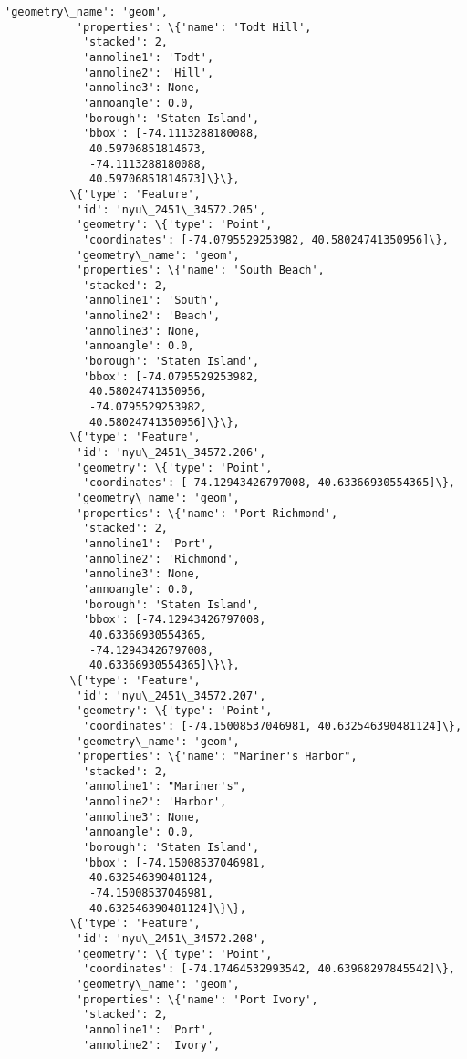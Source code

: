 \documentclass[11pt]{article}
\begin{document}
\begin{Verbatim}[commandchars=\\\{\}]
           'geometry\_name': 'geom',
           'properties': \{'name': 'Todt Hill',
            'stacked': 2,
            'annoline1': 'Todt',
            'annoline2': 'Hill',
            'annoline3': None,
            'annoangle': 0.0,
            'borough': 'Staten Island',
            'bbox': [-74.1113288180088,
             40.59706851814673,
             -74.1113288180088,
             40.59706851814673]\}\},
          \{'type': 'Feature',
           'id': 'nyu\_2451\_34572.205',
           'geometry': \{'type': 'Point',
            'coordinates': [-74.0795529253982, 40.58024741350956]\},
           'geometry\_name': 'geom',
           'properties': \{'name': 'South Beach',
            'stacked': 2,
            'annoline1': 'South',
            'annoline2': 'Beach',
            'annoline3': None,
            'annoangle': 0.0,
            'borough': 'Staten Island',
            'bbox': [-74.0795529253982,
             40.58024741350956,
             -74.0795529253982,
             40.58024741350956]\}\},
          \{'type': 'Feature',
           'id': 'nyu\_2451\_34572.206',
           'geometry': \{'type': 'Point',
            'coordinates': [-74.12943426797008, 40.63366930554365]\},
           'geometry\_name': 'geom',
           'properties': \{'name': 'Port Richmond',
            'stacked': 2,
            'annoline1': 'Port',
            'annoline2': 'Richmond',
            'annoline3': None,
            'annoangle': 0.0,
            'borough': 'Staten Island',
            'bbox': [-74.12943426797008,
             40.63366930554365,
             -74.12943426797008,
             40.63366930554365]\}\},
          \{'type': 'Feature',
           'id': 'nyu\_2451\_34572.207',
           'geometry': \{'type': 'Point',
            'coordinates': [-74.15008537046981, 40.632546390481124]\},
           'geometry\_name': 'geom',
           'properties': \{'name': "Mariner's Harbor",
            'stacked': 2,
            'annoline1': "Mariner's",
            'annoline2': 'Harbor',
            'annoline3': None,
            'annoangle': 0.0,
            'borough': 'Staten Island',
            'bbox': [-74.15008537046981,
             40.632546390481124,
             -74.15008537046981,
             40.632546390481124]\}\},
          \{'type': 'Feature',
           'id': 'nyu\_2451\_34572.208',
           'geometry': \{'type': 'Point',
            'coordinates': [-74.17464532993542, 40.63968297845542]\},
           'geometry\_name': 'geom',
           'properties': \{'name': 'Port Ivory',
            'stacked': 2,
            'annoline1': 'Port',
            'annoline2': 'Ivory',

\end{Verbatim}
\end{document}
